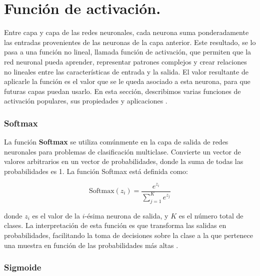 \section{Función de activación.}

Entre capa y capa de las redes neuronales, cada neurona suma ponderadamente las entradas provenientes de las neuronas de la capa anterior. Este resultado, se lo pasa a una función no lineal, llamada función de activación, que permiten que la red neuronal pueda aprender, representar patrones complejos y crear relaciones no lineales entre las características de entrada y la salida. El valor resultante de aplicarle la función es el valor que se le queda asociado a esta neurona, para que futuras capas puedan usarlo. En esta sección, describimos varias funciones de activación populares, sus propiedades y aplicaciones \citep{pajares2021aprendizaje}.


\subsubsection*{Softmax}


La función \textbf{Softmax} se utiliza comúnmente en la capa de salida de redes neuronales para problemas de clasificación multiclase. Convierte un vector de valores arbitrarios en un vector de probabilidades, donde la suma de todas las probabilidades es 1. La función Softmax está definida como:

\begin{equation}
    \text{Softmax}(z_i) = \frac{e^{z_i}}{\sum_{j=1}^{K} e^{z_j}}
\end{equation}

donde \(z_i\) es el valor de la \(i\)-ésima neurona de salida, y \(K\) es el número total de clases. La interpretación de esta función es que transforma las salidas en probabilidades, facilitando la toma de decisiones sobre la clase a la que pertenece una muestra en función de las probabilidades más altas \citep{pajares2021aprendizaje}. 




\subsubsection*{Sigmoide}


